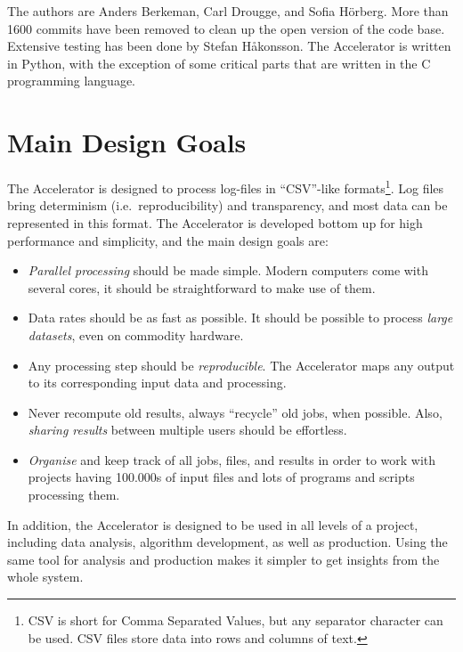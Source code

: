 The authors are Anders Berkeman, Carl Drougge, and Sofia H\"orberg.
More than 1600 commits have been removed to clean up the open version
of the code base.  Extensive testing has been done by Stefan
H{\aa}konsson.  The Accelerator is written in Python, with the
exception of some critical parts that are written in the C programming
language.



\section{Main Design Goals}
The Accelerator is designed to process log-files in ``CSV''-like
formats\footnote{CSV is short for Comma Separated Values, but any
separator character can be used.  CSV files store data into rows and
columns of text.}.  Log files bring determinism (i.e.\
reproducibility) and transparency, and most data can be represented in
this format.  The Accelerator is developed bottom up for high
performance and simplicity, and the main design goals are:
\begin{itemize}

\item[] \textsl{Parallel processing} should be made simple.  Modern computers
  come with several cores, it should be straightforward to make use of
  them.

\item[] Data rates should be as fast as possible.  It should be
  possible to process \textsl{large datasets}, even on commodity hardware.

\item[] Any processing step should be \textsl{reproducible}.
The Accelerator maps any output to its corresponding input data and
processing.

\item[] Never recompute old results, always ``recycle'' old jobs, when
  possible.  Also, \textsl{sharing results} between multiple users should be
  effortless.

\item[] \textsl{Organise} and keep track of all jobs, files, and results in
  order to work with projects having 100.000s of input files and lots
  of programs and scripts processing them.
  
\end{itemize}
In addition, the Accelerator is designed to be used in all levels of a
project, including data analysis, algorithm development, as well as
production.  Using the same tool for analysis and production makes it
simpler to get insights from the whole system.
